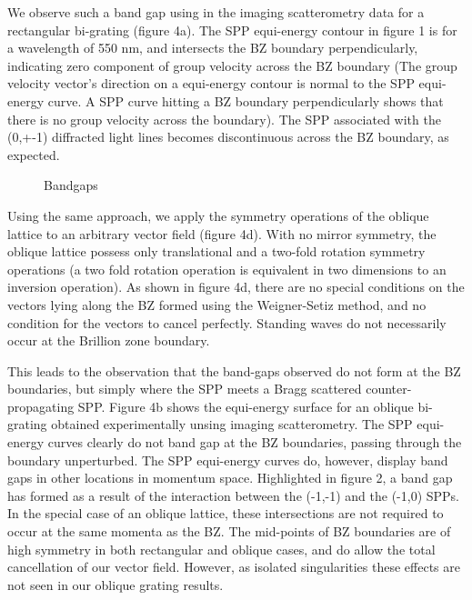 \documentclass[oneside,11pt,book]{book}
\begin{document}
We observe such a band gap using in the imaging scatterometry data for a rectangular bi-grating (figure 4a). The SPP equi-energy contour in figure 1 is for a wavelength of 550 nm, and intersects the BZ boundary perpendicularly, indicating zero component of group velocity across the BZ boundary (The group velocity vector’s direction on a equi-energy contour is normal to the SPP equi-energy curve. A SPP curve hitting a BZ boundary perpendicularly shows that there is no group velocity across the boundary). The SPP associated with the (0,+-1) diffracted light lines becomes discontinuous across the BZ boundary, as expected.
\begin{figure}
\caption{Bandgaps}
\end{figure}
Using the same approach, we apply the symmetry operations of the oblique lattice to an arbitrary vector field (figure 4d). With no mirror symmetry, the oblique lattice possess only translational and a two-fold rotation symmetry operations (a two fold rotation operation is equivalent in two dimensions to an inversion operation). As shown in figure 4d, there are no special conditions on the vectors lying along the BZ formed using the Weigner-Setiz method, and no condition for the vectors to cancel perfectly. Standing waves do not necessarily occur at the Brillion zone boundary. 

This leads to the observation that the band-gaps observed do not form at the BZ boundaries, but simply where the SPP meets a Bragg scattered counter-propagating SPP. Figure 4b shows the equi-energy surface for an oblique bi-grating obtained experimentally unsing imaging scatterometry. The SPP equi-energy curves clearly do not band gap at the BZ boundaries, passing through the boundary unperturbed. The SPP equi-energy curves do, however, display band gaps in other locations in momentum space. Highlighted in figure 2, a band gap has formed as a result of the interaction between the (-1,-1) and the (-1,0) SPPs. In the special case of an oblique lattice, these intersections are not required to occur at the same momenta as the BZ.
The mid-points of BZ boundaries are of high symmetry in both rectangular and oblique cases, and do allow the total cancellation of our vector field. However, as isolated singularities these effects are not seen in our oblique grating results.


 
\end{document}
